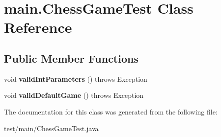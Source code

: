 \hypertarget{classmain_1_1_chess_game_test}{}\section{main.\+Chess\+Game\+Test Class Reference}
\label{classmain_1_1_chess_game_test}
\subsection*{Public Member Functions}
\begin{DoxyCompactItemize}
\item 
\mbox{\label{classmain_1_1_chess_game_test_ad7654845876e51522cca80f7047a52fd}} 
void {\bfseries valid\+Int\+Parameters} ()  throws Exception 
\item 
\mbox{\label{classmain_1_1_chess_game_test_a1c8b4d5cd4e3134d121bb28b1bb55b84}} 
void {\bfseries valid\+Default\+Game} ()  throws Exception 
\end{DoxyCompactItemize}


The documentation for this class was generated from the following file\+:\begin{DoxyCompactItemize}
\item 
test/main/Chess\+Game\+Test.\+java\end{DoxyCompactItemize}
